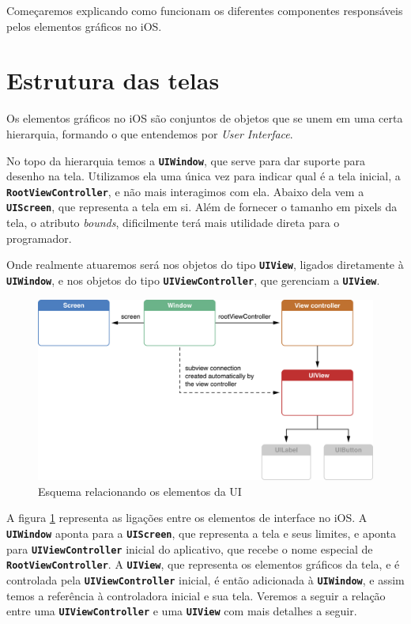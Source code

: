 \documentclass[a4paper,12pt,brazil,doubleside]{book}
\begin{document}
\begin{singlespace}
Começaremos explicando como funcionam os diferentes componentes responsáveis pelos elementos gráficos no iOS.

\section{Estrutura das telas}


Os elementos gráficos no iOS são conjuntos de objetos que se unem em uma certa hierarquia, formando o que entendemos por \emph{User Interface}.

No topo da hierarquia temos a \texttt{\textbf{UIWindow}}, que serve para dar suporte para desenho na tela. Utilizamos ela uma única vez para indicar qual é a tela inicial, a \texttt{\textbf{RootViewController}}, e não mais interagimos com ela. Abaixo dela vem a \texttt{\textbf{UIScreen}}, que representa a tela em si. Além de fornecer o tamanho em pixels da tela, o atributo \emph{bounds}, dificilmente terá mais utilidade direta para o programador.

Onde realmente atuaremos será nos objetos do tipo \texttt{\textbf{UIView}}, ligados diretamente à \texttt{\textbf{UIWindow}}, e nos objetos do tipo \texttt{\textbf{UIViewController}}, que gerenciam a \texttt{\textbf{UIView}}.

\begin{figure}[H]
  \centering
  \includegraphics[width=.75\textwidth]{figuras/apple_window_view_controller_screen.png}
  \caption{Esquema relacionando os elementos da UI}
  \label{fig:relacionamento_UI}
\end{figure}

A figura \ref{fig:relacionamento_UI} representa as ligações entre os elementos de interface no iOS. A \texttt{\textbf{UIWindow}} aponta para a \texttt{\textbf{UIScreen}}, que representa a tela e seus limites, e aponta para  \texttt{\textbf{UIViewController}} inicial do aplicativo, que recebe o nome especial de \texttt{\textbf{RootViewController}}. A \texttt{\textbf{UIView}}, que representa os elementos gráficos da tela, e é controlada pela \texttt{\textbf{UIViewController}} inicial, é então adicionada à \texttt{\textbf{UIWindow}}, e assim temos a referência à controladora inicial e sua tela. Veremos a seguir a relação entre uma \texttt{\textbf{UIViewController}} e uma \texttt{\textbf{UIView}} com mais detalhes a seguir.


\end{singlespace}
\end{document}
